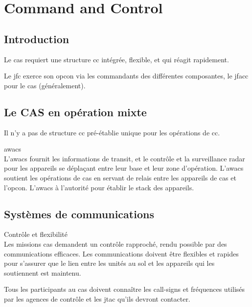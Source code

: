 \chapter{Command and Control}

\begin{center}
\end{center}

\section{Introduction}

\e
	\item Le \gls{cas} requiert une structure \gls{cc} intégrée, flexible, et qui réagit rapidement.
	
	\item Le \gls{jfc} exerce son \gls{opcon} via les commandants des différentes composantes, le \gls{jfacc} pour le \gls{cas} (généralement).
\ed

\section{Le CAS en opération mixte}

\e
	\item Il n'y a pas de structure \gls{cc} pré-établie unique pour les opérations de \gls{cc}.
	\item \gls{awacs} \\
	L'\gls{awacs} fournit les informations de transit, et le contrôle et la surveillance radar pour les appareils se déplaçant entre leur base et leur zone d'opération. L'\gls{awacs} soutient les opérations de \gls{cas} en servant de relais entre les appareils de \gls{cas} et l'\gls{opcon}. L'\gls{awacs} à l'autorité pour établir le \gls{stack} des appareils.	
\ed

\section{Systèmes de communications}

\e
	\item Contrôle et flexibilité \\
	Les missions \gls{cas} demandent un contrôle rapproché, rendu possible par des communications efficaces. Les communications doivent être flexibles et rapides pour s'assurer que le lien entre les unités au sol et les appareils qui les soutiennent est maintenu.
	\item Tous les participants au \gls{cas} doivent connaître les call-signs et fréquences utilisés par les agences de contrôle et les \gls{jtac} qu'ils devront contacter.
\ed